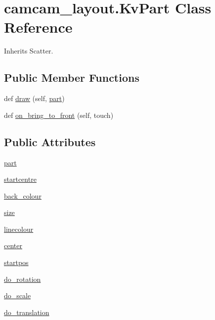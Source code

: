 \hypertarget{classcamcam__layout_1_1_kv_part}{}\section{camcam\+\_\+layout.\+Kv\+Part Class Reference}
\label{classcamcam__layout_1_1_kv_part}


Inherits Scatter.

\subsection*{Public Member Functions}
\begin{DoxyCompactItemize}
\item 
def \hyperlink{classcamcam__layout_1_1_kv_part_aaf59bb33b7b6219c158491e4a6577fe9}{draw} (self, \hyperlink{classcamcam__layout_1_1_kv_part_a802f4bf14a71700a9019b069ed29916e}{part})
\item 
def \hyperlink{classcamcam__layout_1_1_kv_part_a96759e03e1694ba9ed5a6dd0feb3bc63}{on\+\_\+bring\+\_\+to\+\_\+front} (self, touch)
\end{DoxyCompactItemize}
\subsection*{Public Attributes}
\begin{DoxyCompactItemize}
\item 
\hyperlink{classcamcam__layout_1_1_kv_part_a802f4bf14a71700a9019b069ed29916e}{part}
\item 
\hyperlink{classcamcam__layout_1_1_kv_part_adbf6e3a41fb3ebaf219b7c948fc68ee7}{startcentre}
\item 
\hyperlink{classcamcam__layout_1_1_kv_part_abf1410f1bd0b1d64327cd3d35c923493}{back\+\_\+colour}
\item 
\hyperlink{classcamcam__layout_1_1_kv_part_afeef47f5c689151138611b54edef348a}{size}
\item 
\hyperlink{classcamcam__layout_1_1_kv_part_a5d24a5b060975df8723369d28c67eb76}{linecolour}
\item 
\hyperlink{classcamcam__layout_1_1_kv_part_ab1629e55d722b727c5e28bd5e8d4df39}{center}
\item 
\hyperlink{classcamcam__layout_1_1_kv_part_aa7d453718127aa8315189cbc3675a5f6}{startpos}
\item 
\hyperlink{classcamcam__layout_1_1_kv_part_a6c922fe0be4d0ceae22690a327c84dff}{do\+\_\+rotation}
\item 
\hyperlink{classcamcam__layout_1_1_kv_part_ae3230d8f5b1be8806b350216f4117e7f}{do\+\_\+scale}
\item 
\hyperlink{classcamcam__layout_1_1_kv_part_a1710eb3f3da193538ea500a25f4b948d}{do\+\_\+translation}
\end{DoxyCompactItemize}

